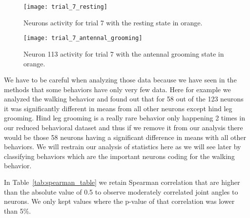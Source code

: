 \begin{figure}[htbp]
	\begin{center}
		\texttt{[image: trial\_7\_resting]}
	\end{center}
	\caption{Neurons activity for trial 7 with the resting state in orange.}
	\label{fig:trial_7_resting}
\end{figure}

\begin{figure}[htbp]
	\begin{center}
		\texttt{[image: trial\_7\_antennal\_grooming]}
	\end{center}
	\caption{Neuron 113 activity for trial 7 with the antennal grooming state in orange.}
\label{fig:trial_7_antennal_grooming}
\end{figure}

We have to be careful when analyzing those data because we have seen in the methods that some behaviors have only very few data. Here for example we analyzed the walking behavior and found out that for 58 out of the 123 neurons it was significantly different in means from all other neurons except hind leg grooming. Hind leg grooming is a really rare behavior only happening 2 times in our reduced behavioral dataset and thus if we remove it from our analysis there would be those 58 neurons having a significant difference in means with all other behaviors. We will restrain our analysis of statistics here as we will see later by classifying behaviors which are the important neurons coding for the walking behavior. 

In Table~\ref{tab:spearman_table} we retain Spearman correlation that are higher than the absolute value of 0.5 to observe moderately correlated joint angles to neurons. We only kept values where the p-value of that correlation was lower than 5\%. 

